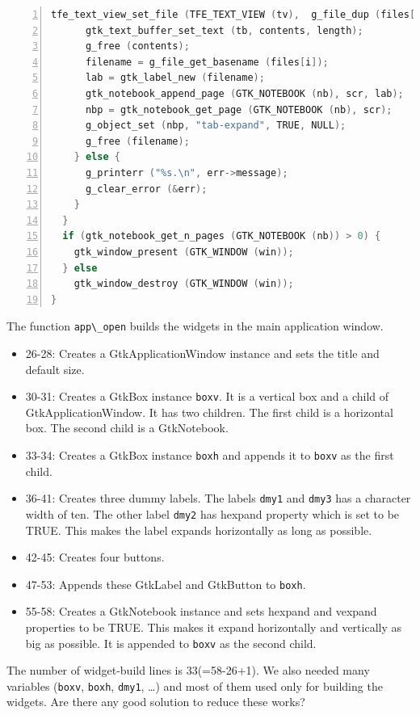 \begin{lstlisting}[language=C, numbers=left]
      tfe_text_view_set_file (TFE_TEXT_VIEW (tv),  g_file_dup (files[i]));
      gtk_text_buffer_set_text (tb, contents, length);
      g_free (contents);
      filename = g_file_get_basename (files[i]);
      lab = gtk_label_new (filename);
      gtk_notebook_append_page (GTK_NOTEBOOK (nb), scr, lab);
      nbp = gtk_notebook_get_page (GTK_NOTEBOOK (nb), scr);
      g_object_set (nbp, "tab-expand", TRUE, NULL);
      g_free (filename);
    } else {
      g_printerr ("%s.\n", err->message);
      g_clear_error (&err);
    }
  }
  if (gtk_notebook_get_n_pages (GTK_NOTEBOOK (nb)) > 0) {
    gtk_window_present (GTK_WINDOW (win));
  } else
    gtk_window_destroy (GTK_WINDOW (win));
}
\end{lstlisting}

The function \passthrough{\lstinline!app\_open!} builds the widgets in
the main application window.

\begin{itemize}
\tightlist
\item
  26-28: Creates a GtkApplicationWindow instance and sets the title and
  default size.
\item
  30-31: Creates a GtkBox instance \passthrough{\lstinline!boxv!}. It is
  a vertical box and a child of GtkApplicationWindow. It has two
  children. The first child is a horizontal box. The second child is a
  GtkNotebook.
\item
  33-34: Creates a GtkBox instance \passthrough{\lstinline!boxh!} and
  appends it to \passthrough{\lstinline!boxv!} as the first child.
\item
  36-41: Creates three dummy labels. The labels
  \passthrough{\lstinline!dmy1!} and \passthrough{\lstinline!dmy3!} has
  a character width of ten. The other label
  \passthrough{\lstinline!dmy2!} has hexpand property which is set to be
  TRUE. This makes the label expands horizontally as long as possible.
\item
  42-45: Creates four buttons.
\item
  47-53: Appends these GtkLabel and GtkButton to
  \passthrough{\lstinline!boxh!}.
\item
  55-58: Creates a GtkNotebook instance and sets hexpand and vexpand
  properties to be TRUE. This makes it expand horizontally and
  vertically as big as possible. It is appended to
  \passthrough{\lstinline!boxv!} as the second child.
\end{itemize}

The number of widget-build lines is 33(=58-26+1). We also needed many
variables (\passthrough{\lstinline!boxv!},
\passthrough{\lstinline!boxh!}, \passthrough{\lstinline!dmy1!}, \ldots)
and most of them used only for building the widgets. Are there any good
solution to reduce these works?

